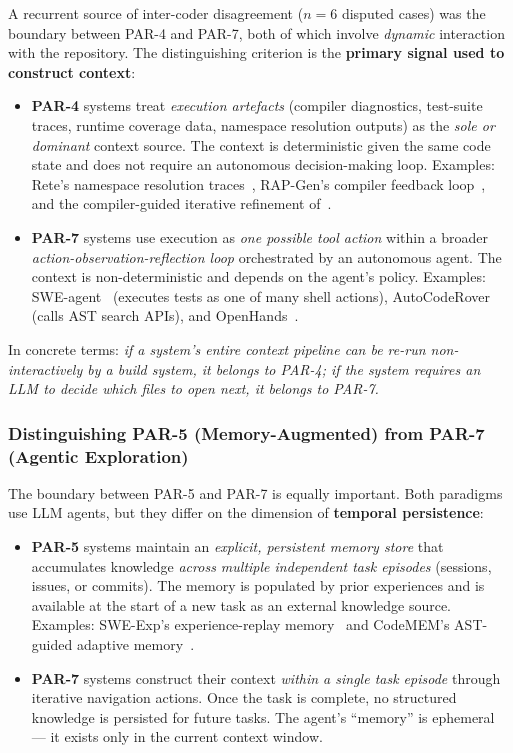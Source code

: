\documentclass[acmsmall,screen,review]{acmart}
\begin{document}
A recurrent source of inter-coder disagreement ($n = 6$ disputed cases)
was the boundary between PAR-4 and PAR-7, both of which involve
\emph{dynamic} interaction with the repository. The distinguishing
criterion is the \textbf{primary signal used to construct context}:

\begin{itemize}
  \item \textbf{PAR-4} systems treat \emph{execution artefacts} (compiler
    diagnostics, test-suite traces, runtime coverage data, namespace
    resolution outputs) as the \emph{sole or dominant} context source.
    The context is deterministic given the same code state and does not
    require an autonomous decision-making loop. Examples: Rete's
    namespace resolution traces~\cite{Parasaram2023Rete},
    RAP-Gen's compiler feedback
    loop~\cite{Wang2023RAPGen}, and the compiler-guided iterative
    refinement of~\cite{Bi2024CompilerFeedback}.
  \item \textbf{PAR-7} systems use execution as \emph{one possible tool
    action} within a broader \emph{action-observation-reflection loop}
    orchestrated by an autonomous agent. The context is non-deterministic
    and depends on the agent's policy. Examples:
    SWE-agent~\cite{Yang2024SWEAgent} (executes tests as one of many
    shell actions), AutoCodeRover~\cite{Zhang2024ACR} (calls AST
    search APIs), and OpenHands~\cite{Wang2025OpenHands}.
\end{itemize}

In concrete terms: \emph{if a system's entire context pipeline can be
re-run non-interactively by a build system, it belongs to PAR-4; if the
system requires an LLM to decide which files to open next, it belongs to
PAR-7.}

\subsubsection{Distinguishing PAR-5 (Memory-Augmented) from
  PAR-7 (Agentic Exploration)}
\label{subsubsec:par5_vs_par7}

The boundary between PAR-5 and PAR-7 is equally important. Both
paradigms use LLM agents, but they differ on the dimension of
\textbf{temporal persistence}:

\begin{itemize}
  \item \textbf{PAR-5} systems maintain an \emph{explicit, persistent
    memory store} that accumulates knowledge \emph{across multiple
    independent task episodes} (sessions, issues, or commits). The memory
    is populated by prior experiences and is available at the start of a
    new task as an external knowledge source. Examples: SWE-Exp's
    experience-replay memory~\cite{Chen2025SWEExp} and CodeMEM's
    AST-guided adaptive memory~\cite{Wang2026CodeMEM}.
  \item \textbf{PAR-7} systems construct their context \emph{within a
    single task episode} through iterative navigation actions. Once the
    task is complete, no structured knowledge is persisted for future
    tasks. The agent's ``memory'' is ephemeral — it exists only in the
    current context window.
\end{itemize}
\end{document}

